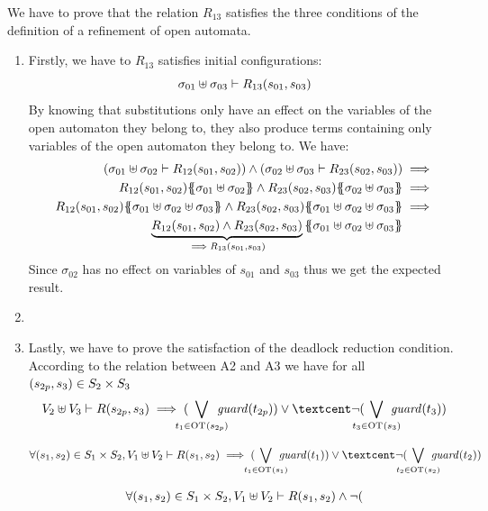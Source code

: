 \documentclass[runningheads]{llncs}
\begin{document}
We have to prove that the relation $R_{13}$ satisfies the three conditions of the definition of a refinement of open automata.
\begin{enumerate}
\item Firstly, we have to $R_{13}$ satisfies initial configurations:
\[\sigma_{01} \uplus \sigma_{03} \vdash R_{13} {\left(s_{01}, s_{03}\right)}\]
By knowing that substitutions only have an effect on the variables of the open automaton they belong to, they also produce terms containing only variables of the open automaton they belong to. We have:
\begin{align*}
\mpar{\sigma_{01} \uplus \sigma_{02} \vdash R_{12}\mpar{s_{01}, s_{02}}} \wedge \mpar
{\sigma_{02} \uplus \sigma_{03} \vdash R_{23}\mpar{s_{02}, s_{03}}}&\implies\\
R_{12}\mpar{s_{01},s_{02}}\psubst{\sigma_{01} \uplus \sigma_{02}} \wedge R_{23}\mpar{s_{02}, s_{03}}\psubst{\sigma_{02} \uplus \sigma_{03}}&\implies\\
R_{12}\mpar{s_{01},s_{02}}\psubst{\sigma_{01} \uplus \sigma_{02} \uplus \sigma_{03}} \wedge R_{23}\mpar{s_{02}, s_{03}}\psubst{\sigma_{01} \uplus \sigma_{02} \uplus \sigma_{03}}&\implies\\ 
\underbrace{R_{12}\mpar{s_{01},s_{02}}\wedge R_{23}\mpar{s_{02}, s_{03}}}_{\implies R_{13} \mpar{s_{01}, s_{03}}}\psubst{\sigma_{01} \uplus \sigma_{02} \uplus \sigma_{03}} %
 \end{align*}
Since $\sigma_{02}$ has no effect on variables of $s_{01}$ and $s_{03}$ thus we get the expected result.

\item {}

\item Lastly, we have to prove the satisfaction of the deadlock reduction condition. According to the relation between A2 and A3 we have for all ${\left(s_{2p},s_3\right)} \in S_2\times S_3$
\begin{multline*}
 V_2 \uplus V_3  \vdash R\mpar{s_{2p},s_3} \implies ( \bigvee_\subbox{t_1 \in \fOT{s_{2p}}} \fguard{t_{2p}} ) \lor¢ \lnot( \bigvee_\subbox{t_3 \in \fOT{s_3}} \fguard{t_3} )
\end{multline*}



\begin{multline*}
\forall \mpar{s_1, s_2} \in S_1 \times S_2, V_1 \uplus V_2  \vdash R\mpar{s_1, s_2} \implies( \bigvee_\subbox{t_1 \in \fOT{s_1}} \fguard{t_1} ) \lor¢ \lnot( \bigvee_\subbox{t_2 \in \fOT{s_2}} \fguard{t_2}  )
\end{multline*}


\begin{multline*}
\forall \mpar{s_1, s_2} \in S_1 \times S_2, V_1 \uplus V_2  \vdash R\mpar{s_1, s_2} \wedge \lnot( %
\end{multline*}

\end{enumerate}
\end{document}
